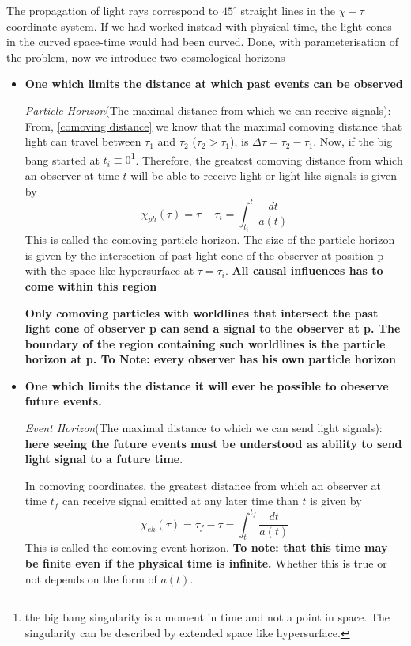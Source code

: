 \documentclass[12pt]{report}
\newcommand{\tbf}[1]{\textbf{#1}}
\newcommand{\tit}[1]{\textit{#1}}
\newcommand{\fn}[1]{\footnote{#1}}
\begin{document}
The propagation of light rays correspond to $45^\circ$ straight lines in the $\chi- \tau$ coordinate system. If we had worked instead with physical time, the light cones in the curved space-time would had been curved.
\newpage
Done, with parameterisation of the problem, now we introduce two cosmological horizons
\begin{itemize}
\item \tbf{One which limits the distance at which past events can be observed}

\tit{Particle Horizon}(The maximal distance from which we can receive signals): From, \eqref{comoving distance} we know that the maximal comoving distance that light can travel between $\tau_1$ and $\tau_2$ ($\tau_2 > \tau_1$), is $\Delta \tau = \tau_2 -\tau_1$.
Now, if the big bang started at $t_i \equiv 0$\fn{the big bang singularity is a moment in time and not a point in space. The singularity can be described by extended space like hypersurface.}. Therefore, the greatest comoving distance from which an observer at time $t$ will be able to receive light or light like signals is given by
\begin{equation}\label{particlehorizoneq}
\chi_{ph} (\tau)=\tau - \tau_i = \int^{t}_{t_i}{\frac{dt}{a(t)}}
\end{equation}
This is called the comoving particle horizon. The size of the particle horizon is given by the intersection of past light cone of the observer at position p with the space like hypersurface at $\tau=\tau_i$. \tbf{All causal influences has to come within this region}

 \tbf{Only comoving particles with worldlines that intersect the past light cone of  observer p can send a signal to the observer at p. The boundary of the region containing such worldlines is the particle horizon at p. To Note: every observer has his own particle horizon}

\item \tbf{One which limits the distance it will ever be possible to obeserve future events.}


\tit{Event Horizon}(The maximal distance to which we can send light signals): \tbf{here seeing the future events must be understood as ability to send light signal to a future time}.  

In comoving coordinates, the greatest distance from which an observer at time $t_f$ can receive signal emitted at any later time than $t$ is given by
\begin{equation}
\chi_{eh} (\tau)=\tau_f - \tau = \int^{t_f}_{t}{\frac{dt}{a(t)}}
\end{equation}
This is called the comoving event horizon. \tbf{To note: that this time may be finite even if the physical time is infinite.} Whether this is true or not depends on the form of $a(t)$.
\end{itemize}
\end{document}
